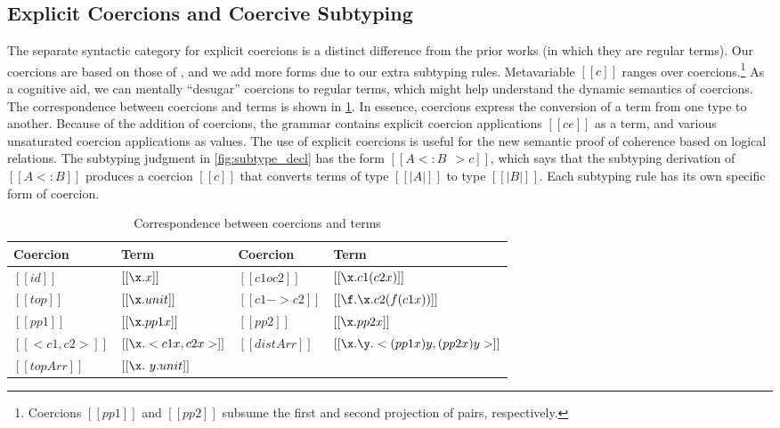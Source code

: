 \subsection{Explicit Coercions and Coercive Subtyping}

The separate syntactic category for explicit coercions is a distinct difference
from the prior works (in which they are regular terms). Our coercions are based
on those of \citet{Henglein_1994}, and we add more forms due to our extra
subtyping rules.
Metavariable $[[c]]$ ranges over coercions.\footnote{Coercions $[[pp1]]$ and $[[pp2]]$ subsume the first and second projection of pairs, respectively.}
As a cognitive aid, we can mentally ``desugar'' coercions to
regular terms, which might help understand the dynamic semantics of coercions. The correspondence
between coercions and terms is shown in \cref{tab:coercion}.
In essence, coercions express the conversion
of a term from one type to another. Because of the addition of coercions, the
grammar contains explicit coercion applications $[[c e]]$ as a term, and various
unsaturated coercion applications as values. The use of explicit coercions is useful for the new semantic
proof of coherence based on logical relations.
The subtyping judgment in \cref{fig:subtype_decl} has the form $[[A <: B ~~> c]]$, which says that the
subtyping derivation of $[[A <: B]]$ produces a coercion $[[c]]$ that converts
terms of type $[[ |A| ]]$ to type $[[ |B| ]]$. Each subtyping rule has its own
specific form of coercion.


\begin{table}[t]
  \centering
\begin{tabular}{|l|l||l|l|}
\hline
Coercion & Term & Coercion & Term \\ \hline
$[[id]]$         & $[[ \x . x]]$  & $[[ c1 o c2  ]]$    &  $[[  \x . c1 (c2 x) ]]$     \\ \hline
$[[top]]$         & $[[ \x . unit ]]$  & $[[ c1 -> c2  ]]$    &  $[[  \f . \x . c2 (f (c1 x))  ]]$     \\ \hline
$[[  pp1   ]]$         & $[[ \x . pp1 x    ]]$  & $[[ pp2  ]]$    &  $[[  \x . pp2 x  ]]$     \\ \hline
$[[  < c1 , c2 >   ]]$         & $[[ \x . < c1 x, c2 x >    ]]$  & $[[ distArr  ]]$    &  $[[  \x . \y . < (pp1 x) y , (pp2 x) y > ]]$     \\ \hline
$[[  topArr   ]]$         & $[[ \x . \ y . unit    ]]$  &  & \\ \hline
\end{tabular}
  \caption{Correspondence between coercions and terms}
  \label{tab:coercion}
\end{table}


